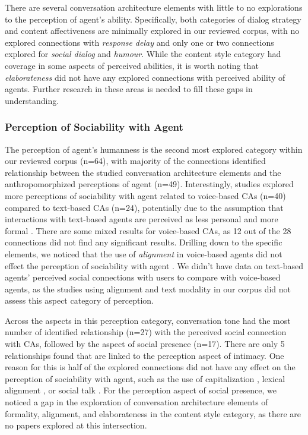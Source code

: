 There are several conversation architecture elements with little to no explorations to the perception of agent's ability. Specifically, both categories of dialog strategy and content affectiveness are minimally explored in our reviewed corpus, with no explored connections with \textit{response delay} and only one or two connections explored for \textit{social dialog} and \textit{humour}. While the content style category had coverage in some aspects of perceived abilities, it is worth noting that \textit{elaborateness} did not have any explored connections with perceived ability of agents. Further research in these areas is needed to fill these gaps in understanding.


\subsubsection{Perception of Sociability with Agent}

The perception of agent's humanness is the second most explored category within our reviewed corpus (n=64), with majority of the connections identified relationship between the studied conversation architecture elements and the anthropomorphized perceptions of agent (n=49). Interestingly, studies explored more perceptions of sociability with agent related to voice-based CAs (n=40) compared to text-based CAs (n=24), potentially due to the assumption that interactions with text-based agents are perceived as less personal and more formal \cite{kocielnik2018designing}. There are some mixed results for voice-based CAs, as 12 out of the 28 connections did not find any significant results. Drilling down to the specific elements, we noticed that the use of \textit{alignment} in voice-based agents did not effect the perception of sociability with agent \cite{healey2013relating}\cmt{[39]}\cite{linnemann2018can}\cmt{[15]}. We didn't have data on text-based agents' perceived social connections with users to compare with voice-based agents, as the studies using alignment and text modality in our corpus did not assess this aspect category of perception.

Across the aspects in this perception category, conversation tone had the most number of identified relationship (n=27) with the perceived social connection with CAs, followed by the aspect of social presence (n=17). There are only 5 relationships found that are linked to the perception aspect of intimacy. One reason for this is half of the explored connections did not have any effect on the perception of sociability with agent, such as the use of capitalization \cite{westerman2019believe}\cmt{[9]}, lexical alignment \cite{linnemann2018can}\cmt{[15]}, or social talk \cite{lubold2016effects}\cmt{[86]}. For the perception aspect of social presence, we noticed a gap in the exploration of conversation architecture elements of formality, alignment, and elaborateness in the content style category, as there are no papers explored at this intersection.

